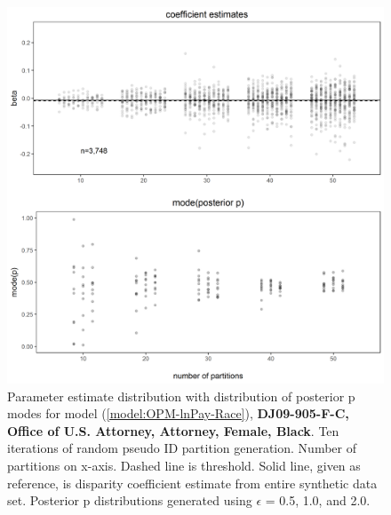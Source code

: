 \documentclass[10pt, letterpaper]{article}
\begin{document}
\begin{spacing}{1.0}
\begin{figure}[]
    \centering
    \includegraphics[width=6in]{images/RacePayDifferentialBetaWithPosteriorDistribution-DJ09-905-F-C.png}
    \caption{Parameter estimate distribution with distribution of posterior p modes for model (\ref{model:OPM-lnPay-Race}), \textbf{DJ09-905-F-C, Office of U.S. Attorney, Attorney, Female, Black}.  Ten iterations of random pseudo ID partition generation.  Number of partitions on x-axis.  Dashed line is threshold.  Solid line, given as reference, is disparity coefficient estimate from entire synthetic data set.  Posterior p distributions generated using $\epsilon$ = 0.5, 1.0, and 2.0.}
    \label{figure:RacePayDifferentialBetaWithPosteriorDistribution-DJ09-905-F-C}
\end{figure}

\clearpage


\end{spacing}
\end{document}
